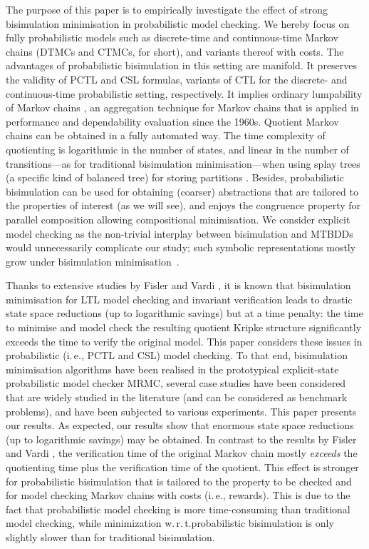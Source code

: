 \documentclass{llncs}
\begin{document}
The purpose of this paper is to empirically investigate the effect of strong bisimulation minimisation 
in probabilistic model checking.
We hereby focus on fully probabilistic models such as discrete-time and continuous-time Markov 
chains (DTMCs and CTMCs, for short), and variants thereof with costs.
The advantages of probabilistic bisimulation \cite{LarsenS_IC91} in this setting are manifold.
It preserves the validity of PCTL \cite{HanssonJ_FAC94} and CSL \cite{AzizSSB_ACMTCL00,BaierHHK_TSE03} formulas, variants of CTL for the discrete- and continuous-time probabilistic setting, respectively.
It implies ordinary lumpability of Markov chains \cite{Buchholz_JAP94}, an aggregation technique for Markov chains that is applied in performance and dependability evaluation since the 1960s.
Quotient Markov chains can be obtained in a fully automated way.
The time complexity of quotienting is logarithmic in the number of states, and linear in the number 
of transitions---as for  traditional bisimulation minimisation---when using splay trees (a specific kind 
of balanced tree) for storing partitions \cite{DerisaviHS_IPL03}.
Besides, probabilistic bisimulation can be used for obtaining (coarser) abstractions that are
tailored to the properties of interest (as we will see), and enjoys the congruence property for
parallel composition allowing compositional minimisation.
We consider explicit model checking as the non-trivial interplay between bisimulation and 
MTBDDs would unnecessarily complicate our study; such symbolic representations mostly grow
under bisimulation minimisation~\cite{HermannsKNPS_JLAP03}. 

Thanks to extensive studies by Fisler and Vardi \cite{FislerV_FMCAD98,FislerV_CHARME99,FislerV_FMSD02}, it is known that 
bisimulation minimisation for LTL model checking and invariant verification leads to drastic state 
space reductions (up to logarithmic savings) but at a time penalty: the time to minimise and 
model check the resulting quotient Kripke structure significantly exceeds the time to verify 
the original model.
This paper considers these issues in probabilistic (i.\,e., PCTL and CSL) model checking.  
To that end, bisimulation minimisation algorithms have been realised in the prototypical 
explicit-state probabilistic model checker MRMC, several case studies have been considered that are
widely studied in the literature (and can be considered as benchmark problems), and
have been subjected to various experiments.
This paper presents our results.
As expected, our results show that enormous state space reductions (up to logarithmic savings) 
may be obtained.  
In contrast to the results by Fisler and Vardi \cite{FislerV_FMCAD98,FislerV_CHARME99,FislerV_FMSD02}, the verification time of 
the original Markov chain mostly \emph{exceeds} the quotienting time plus the verification time of 
the quotient.
	This effect is stronger for probabilistic bisimulation
	that is tailored to the property to be checked
	and for model checking Markov chains with costs (i.\,e.\@, rewards).
	This is due to the fact
	that probabilistic model checking is more time-consuming
	than traditional model checking,
	while minimization w.\,r.\,t.\@ probabilistic bisimulation
	is only slightly slower than for traditional bisimulation.
\end{document}

